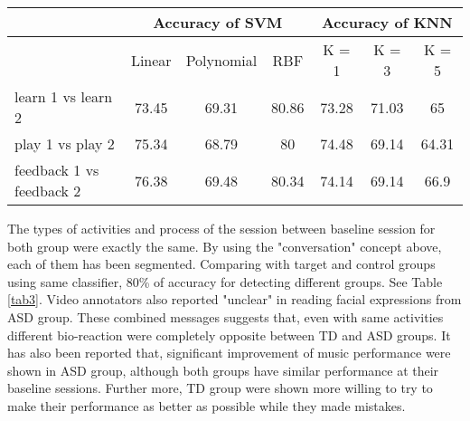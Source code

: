 \begin{table*}[tbp]
	
	\begin{center}
		\label{tab3}
		\begin{tabular}{lcccccc}
			\multicolumn{1}{c}{\multirow{2}{*}{}} & \multicolumn{3}{c}{Accuracy of SVM} & \multicolumn{3}{c}{Accuracy of KNN} \\
			\hline
			\multicolumn{1}{c}{}                  & Linear   & Polynomial    & RBF    & K = 1   & K = 3     & K = 5     \\
			\hline
			learn 1 vs learn 2                                 & 73.45    & 69.31   & 80.86  & 73.28   & 71.03   & 65      \\
			\hline
			play 1 vs play 2                                 & 75.34    & 68.79   & 80     & 74.48   & 69.14   & 64.31   \\
			\hline
			feedback 1 vs feedback 2                                 & 76.38    & 69.48   & 80.34  & 74.14   & 69.14   & 66.9   
		\end{tabular}
		\caption{classification rate in robot demo, kids play and robot feedback across
			warm up (S1) and music practice (S2) sections} 
		\label{tab3}
	\end{center}
\end{table*}


The types of activities and process of the session between baseline session for both group were 
exactly the same. By using the "conversation" concept above, each of them has been segmented.
Comparing with target and control groups using same classifier, 80\% of accuracy for detecting
different groups. See Table \ref{tab3}. Video annotators also reported "unclear" in reading 
facial expressions from ASD group. These combined messages suggests that, even with same activities
different bio-reaction were completely opposite between TD and ASD groups. It has 
also been reported that, significant improvement of music performance were shown in ASD group, 
although both groups have similar performance at their baseline sessions. Further more, TD group 
were shown more willing to try to make their performance as better as possible while they made
mistakes.\\

